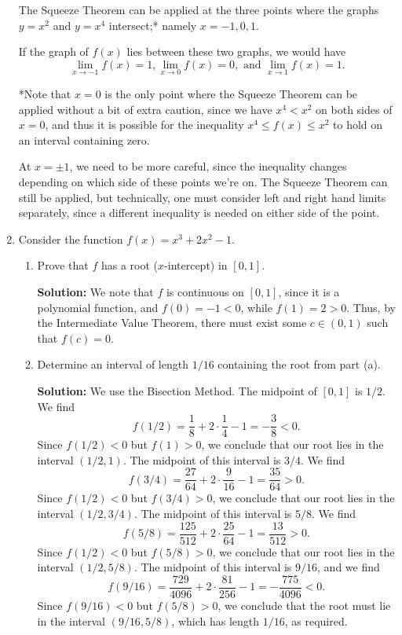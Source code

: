 \documentclass[12pt]{article}
\begin{document}
\begin{enumerate}
The Squeeze Theorem can be applied at the three points where the graphs $y=x^2$ and $y=x^4$ intersect;* namely $x=-1,0,1$.

If the graph of $f(x)$ lies between these two graphs, we would have
\[
\lim_{x\to -1}f(x) = 1, \lim_{x\to 0}f(x) = 0, \text{ and } \lim_{x\to 1}f(x) = 1.
\]

*Note that $x=0$ is the only point where the Squeeze Theorem can be applied without a bit of extra caution, since we have $x^4<x^2$ on both sides of $x=0$, and thus it is possible for the inequality $x^4\leq f(x)\leq x^2$ to hold on an interval containing zero.

At $x=\pm 1$, we need to be more careful, since the inequality changes depending on which side of these points we're on. The Squeeze Theorem can still be applied, but technically, one must consider left and right hand limits separately, since a different inequality is needed on either side of the point.


 
 \item Consider the function $f(x)=x^3+2x^2-1$.
 \begin{enumerate}
 \item Prove that $f$ has a root ($x$-intercept) in $[0,1]$.
 
 \medskip
 
\textbf{Solution:} We note that $f$ is continuous on $[0,1]$, since it is a polynomial function, and $f(0)=-1<0$, while $f(1) = 2>0$. Thus, by the Intermediate Value Theorem, there must exist some $c\in (0,1)$ such that $f(c)=0$.

\bigskip
 
 \item Determine an interval of length $1/16$ containing the root from part (a).
 
 \medskip
 
\textbf{Solution:} We use the Bisection Method. The midpoint of $[0,1]$ is $1/2$. We find
\[
f(1/2) = \frac{1}{8}+2\cdot\frac{1}{4}-1 = -\frac{3}{8}<0.
\]
Since $f(1/2)<0$ but $f(1)>0$, we conclude that our root lies in the interval $(1/2,1)$. The midpoint of this interval is $3/4$. We find
\[
f(3/4) = \frac{27}{64}+2\cdot \frac{9}{16}-1 = \frac{35}{64}>0.
\]
Since $f(1/2)<0$ but $f(3/4)>0$, we conclude that our root lies in the interval $(1/2,3/4)$. The midpoint of this interval is $5/8$. We find
\[
f(5/8) = \frac{125}{512}+2\cdot \frac{25}{64}-1 = \frac{13}{512}>0.
\]
Since $f(1/2)<0$ but $f(5/8)>0$, we conclude that our root lies in the interval $(1/2,5/8)$. The midpoint of this interval is $9/16$, and we find
\[
f(9/16) = \frac{729}{4096}+2\cdot \frac{81}{256}-1 = -\frac{775}{4096}<0.
\]
Since $f(9/16)<0$ but $f(5/8)>0$, we conclude that the root must lie in the interval $(9/16, 5/8)$, which has length $1/16$, as required.
 \end{enumerate}


\end{enumerate}
\end{document}
